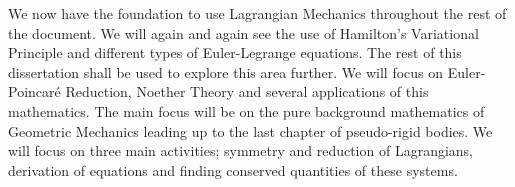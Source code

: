 \noindent
We now have the foundation to use Lagrangian Mechanics throughout the rest of the document. We will again and again see the use of Hamilton's Variational Principle and different types of Euler-Legrange equations. The rest of this dissertation shall be used to explore this area further. We will focus on Euler-Poincar\'e Reduction, Noether Theory and several applications of this mathematics. The main focus will be on the pure background mathematics of Geometric Mechanics leading up to the last chapter of pseudo-rigid bodies. We will focus on three main activities; symmetry and reduction of Lagrangians, derivation of equations and finding conserved quantities of these systems.


